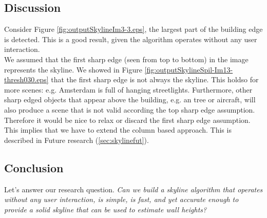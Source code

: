 \newpage
{}


\clearpage

\subsection{Discussion}  %
Consider Figure \ref{fig:outputSkylineIm3-3.eps}, the largest part of the
building edge is detected. This is a good result, given the algorithm
operates without any user interaction.\\

We assumed that the first sharp edge (seen from top to bottom) in the image 
represents the skyline. We showed in Figure \ref{fig:outputSkylineSpil-Im13-thresh030.eps}
that the first sharp edge is not always the skyline.
This holdso for more scenes: e.g. Amsterdam is full of
hanging streetlights.  Furthermore, other sharp edged objects that appear above
the building, e.g. an tree or aircraft, will also produce a scene that is not valid according the top sharp
edge assumption.  Therefore it would be nice to relax or discard the first sharp edge assumption.
This implies that we have to extend the column based approach. This is described in Future research
(\ref{sec:skylinefut}).

\subsection{Conclusion}
Let's answer our research question.
\emph{Can we build a skyline algorithm that operates without any user interaction, is
simple, is fast, and yet accurate enough to provide a solid skyline that can be
used to estimate wall heights?}\\


